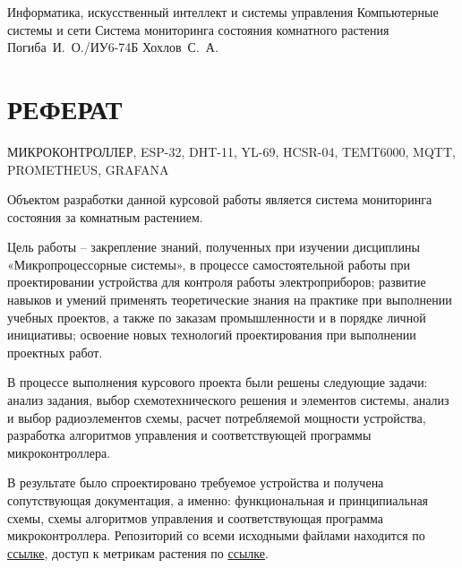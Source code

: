 \documentclass{bmstu}
\begin{document}
    \makecourseworktitle
    {Информатика, искусственный интеллект и системы управления} %
    {Компьютерные системы и сети} %
    {Система мониторинга состояния комнатного растения} %
    {Погиба~И.~О./ИУ6-74Б} %
    {Хохлов~С.~А.} %
    {} %

    \chapter*{РЕФЕРАТ}

    МИКРОКОНТРОЛЛЕР, ESP-32, DHT-11, YL-69, HCSR-04, TEMT6000, MQTT, PROMETHEUS, GRAFANA

    Объектом разработки данной курсовой работы является система мониторинга состояния за комнатным растением.

    Цель работы – закрепление знаний, полученных при изучении дисциплины «Микропроцессорные системы», в процессе самостоятельной работы при проектировании устройства для контроля работы электроприборов; развитие навыков и умений применять теоретические знания на практике при выполнении учебных проектов, а также по заказам промышленности и в порядке личной инициативы; освоение новых технологий проектирования при выполнении проектных работ.

    В процессе выполнения курсового проекта были решены следующие задачи: анализ задания, выбор схемотехнического решения и элементов системы, анализ и выбор радиоэлементов схемы, расчет потребляемой мощности устройства, разработка алгоритмов управления и соответствующей программы микроконтроллера.

    В результате было спроектировано требуемое устройства и получена сопутствующая документация, а именно: функциональная и принципиальная схемы, схемы алгоритмов управления и соответствующая программа микроконтроллера.
    Репозиторий со всеми исходными файлами находится по \href{https://github.com/proooooogiba/plant_monitoring}{ссылке}, доступ к метрикам растения по \href{http://vm4481772.25ssd.had.wf:3000/d/ce3f4anwhavpce/plant-monitoring?from=now-5m&to=now&timezone=browser}{ссылке}.
\end{document}
